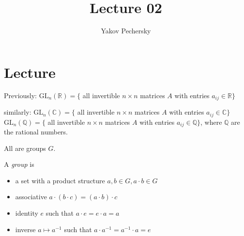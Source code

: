 \documentclass[12pt]{article}
\newcommand{\RR}{\mathbb{R}}
\newcommand{\GL}{\text{GL}}
\newcommand{\inv}[1]{#1^{-1}}
\theoremstyle{definition}
\begin{document}
\author{Yakov Pechersky}

\title{Lecture 02}

\maketitle

\section{Lecture}

Previously: \(\GL_n(\RR) = \{\) all invertible \(n \times n\) matrices \(A\) with entries \(a_{ij} \in \RR\}\)

similarly: \(\GL_n(\mathbb{C}) = \{\) all invertible \(n \times n\) matrices \(A\) with entries \(a_{ij} \in \mathbb{C}\}\)
\(\GL_n(\mathbb{Q}) = \{\) all invertible \(n \times n\) matrices \(A\) with entries \(a_{ij} \in \mathbb{Q}\}\),
where \(\mathbb{Q}\) are the rational numbers.

All are groups \(G\).

A \emph{group} is \begin{itemize} \setlength\itemsep{1em}
    \item a set with a product structure \(a, b \in G, a \cdot b \in G\)
    \item associative \(a \cdot (b \cdot c) = (a \cdot b) \cdot c\)
    \item identity \(e\) such that \(a \cdot e = e \cdot a = a\)
    \item inverse \(a \mapsto \inv{a}\) such that \(a \cdot \inv{a} = \inv{a} \cdot a = e\)
\end{itemize}
\end{document}
